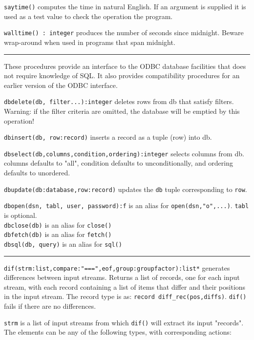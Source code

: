 \texttt{saytime()} computes the time in natural English. If an argument
is supplied it is used as a test value to check the operation the
program.

\texttt{walltime() : integer} produces the number of seconds since
midnight. Beware wrap-around when used in programs that span midnight.

\vspace{0.25cm}\hrule{}

These procedures provide an interface to the ODBC database facilities
that does not require knowledge of SQL. It also provides compatibility
procedures for an earlier version of the ODBC interface.

\texttt{dbdelete(db, filter...):integer} deletes rows from db that satisfy
filters. Warning: if the filter criteria are omitted, the
database will be emptied by this operation!

\texttt{dbinsert(db, row:record)} inserts a record as a tuple (row) into db.

\texttt{dbselect(db,columns,condition,ordering):integer} selects columns from db.
columns defaults to "all", condition
defaults to unconditionally, and ordering defaults to unordered.

\texttt{dbupdate(db:database,row:record)} updates the \texttt{db} tuple
corresponding to \texttt{row}.

\texttt{dbopen(dsn, tabl, user, password):f} is an alias for
\texttt{open(dsn,"o",...)}. \texttt{tabl} is optional.\\
\texttt{dbclose(db)} is an alias for \texttt{close()}\\
\texttt{dbfetch(db)} is an alias for \texttt{fetch()}\\
\texttt{dbsql(db, query)} is an alias for \texttt{sql()}

\vspace{0.25cm}\hrule{}

\texttt{dif(strm:list,compare:"===",eof,group:groupfactor):list*}
generates differences between input streams. 
Returns a list of records, one for each input stream, with each
record containing a list of items that differ and their positions in
the input stream. The record type is as: \texttt{record
diff\_rec(pos,diffs)}. \texttt{dif()} fails if there are no
differences.

\texttt{strm} is a list of input streams from which \texttt{dif()} will
extract its input "records". The elements
can be any of the following types, with corresponding actions:


